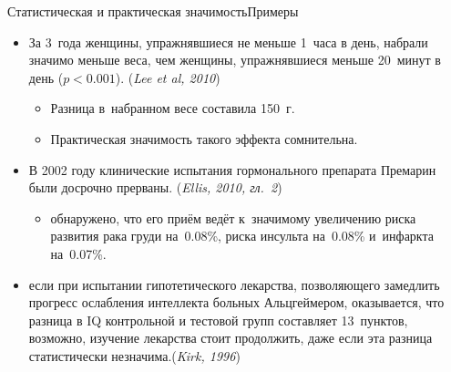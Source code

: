 \documentclass[11pt,pdf,utf8,hyperref={unicode},aspectratio=169]{beamer}
\begin{document}
\begin{frame}{Статистическая и практическая значимость}{Примеры}
	\begin{itemize}
		\item За 3~года женщины, упражнявшиеся не меньше 1~часа в день, набрали значимо меньше веса, чем женщины, упражнявшиеся меньше 20~минут в день ($p<0.001$). \hfill (\textit{Lee et al, 2010})
        \begin{itemize}
            \item Разница в~набранном весе составила 150~г.
		    \item Практическая значимость такого эффекта сомнительна.
        \end{itemize}

		\item В 2002 году клинические испытания гормонального препарата Премарин были досрочно прерваны. \hfill (\textit{Ellis, 2010, гл.~2})
        \begin{itemize}
            \item обнаружено, что его приём ведёт к~значимому увеличению риска развития рака груди на~0.08\%, риска инсульта на~0.08\% и~инфаркта на~0.07\%.
        \end{itemize}

		\item если при испытании гипотетического лекарства, позволяющего замедлить прогресс ослабления интеллекта больных Альцгеймером, оказывается, что разница в IQ контрольной и тестовой групп составляет 13~пунктов, возможно, изучение лекарства стоит продолжить, даже если эта разница статистически незначима.\hfill (\textit{Kirk, 1996})
	\end{itemize}
\end{frame}
\end{document}
